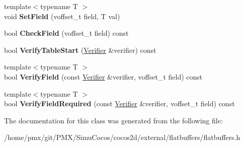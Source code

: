 \begin{DoxyCompactItemize}
{\footnotesize template$<$typename T $>$ }\\void {\bfseries Set\+Field} (voffset\+\_\+t field, T val)
\item 
\mbox{\label{classflatbuffers_1_1Table_ae525f2e90e3330066ecf8bb3f98a09fc}} 
bool {\bfseries Check\+Field} (voffset\+\_\+t field) const
\item 
\mbox{\label{classflatbuffers_1_1Table_a6e6d5f025ff609565a840633bb562acd}} 
bool {\bfseries Verify\+Table\+Start} (\hyperlink{classflatbuffers_1_1Verifier}{Verifier} \&verifier) const
\item 
\mbox{\label{classflatbuffers_1_1Table_a22ad7455085012f0433ba42097321faf}} 
{\footnotesize template$<$typename T $>$ }\\bool {\bfseries Verify\+Field} (const \hyperlink{classflatbuffers_1_1Verifier}{Verifier} \&verifier, voffset\+\_\+t field) const
\item 
\mbox{\label{classflatbuffers_1_1Table_a54c62d4a27586b5eff19b9f445d43938}} 
{\footnotesize template$<$typename T $>$ }\\bool {\bfseries Verify\+Field\+Required} (const \hyperlink{classflatbuffers_1_1Verifier}{Verifier} \&verifier, voffset\+\_\+t field) const
\end{DoxyCompactItemize}


The documentation for this class was generated from the following file\+:\begin{DoxyCompactItemize}
\item 
/home/pmx/git/\+P\+M\+X/\+Simu\+Cocos/cocos2d/external/flatbuffers/flatbuffers.\+h\end{DoxyCompactItemize}
